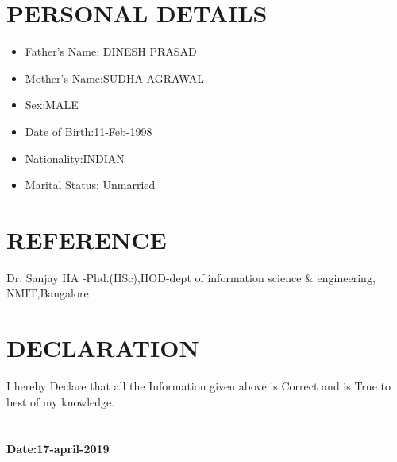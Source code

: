\documentclass[12pt,a4paper,sans]{article}
\begin{document}
 \section*{PERSONAL DETAILS}
	 \begin{itemize}
	 	\item Father's Name: DINESH PRASAD
	 	\item Mother's Name:SUDHA AGRAWAL
	 	\item Sex:MALE
	 	\item Date of Birth:11-Feb-1998
	 	\item Nationality:INDIAN
	 	\item Marital Status: Unmarried
	 		
 	\end{itemize}		
 \section*{REFERENCE}
 	Dr. Sanjay HA -Phd.(IISc),HOD-dept of information science \& engineering, NMIT,Bangalore
	
 \section*{DECLARATION}
 I hereby Declare that all the Information given above is Correct and is True to best of my
 knowledge.
 \section*{ }
 \textbf{Date:17-april-2019}
 	
 
\end{document}
